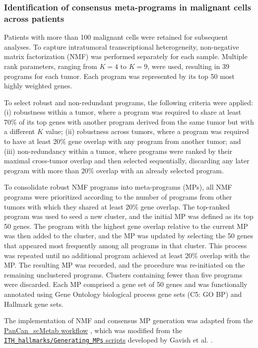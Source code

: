\documentclass[pdflatex,sn-mathphys-num]{sn-jnl}%
\theoremstyle{thmstyleone}%
\theoremstyle{thmstyletwo}%
\theoremstyle{thmstylethree}%
\begin{document}
\subsubsection{Identification of consensus meta-programs in malignant cells across patients}

Patients with more than 100 malignant cells were retained for subsequent analyses. To capture intratumoral transcriptional heterogeneity, non-negative matrix factorization (NMF) was performed separately for each sample. Multiple rank parameters, ranging from $K = 4$ to $K = 9$, were used, resulting in 39 programs for each tumor. Each program was represented by its top 50 most highly weighted genes.

To select robust and non-redundant programs, the following criteria were applied: (i) robustness within a tumor, where a program was required to share at least 70\% of its top genes with another program derived from the same tumor but with a different $K$ value; (ii) robustness across tumors, where a program was required to have at least 20\% gene overlap with any program from another tumor; and (iii) non-redundancy within a tumor, where programs were ranked by their maximal cross-tumor overlap and then selected sequentially, discarding any later program with more than 20\% overlap with an already selected program.

To consolidate robust NMF programs into meta-programs (MPs), all NMF programs were prioritized according to the number of programs from other tumors with which they shared at least 20\% gene overlap. The top-ranked program was used to seed a new cluster, and the initial MP was defined as its top 50 genes. The program with the highest gene overlap relative to the current MP was then added to the cluster, and the MP was updated by selecting the 50 genes that appeared most frequently among all programs in that cluster. This process was repeated until no additional program achieved at least 20\% overlap with the MP. The resulting MP was recorded, and the procedure was re-initiated on the remaining unclustered programs. Clusters containing fewer than five programs were discarded. Each MP comprised a gene set of 50 genes and was functionally annotated using Gene Ontology biological process gene sets (C5: GO BP) and Hallmark gene sets.

The implementation of NMF and consensus MP generation was adapted from the
\href{https://github.com/ZedekiahZhou/PanCan_scMetab}{PanCan\_scMetab workflow}
\cite{bib34}, which was modified from the
\href{https://github.com/tiroshlab/3ca/tree/main/ITH_hallmarks/Generating_MPs}
{\texttt{ITH\_hallmarks/Generating\_MPs} scripts}
developed by Gavish et al. \cite{bib16}.
\end{document}
